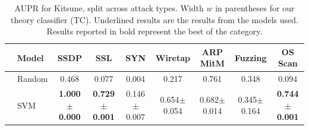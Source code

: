 \documentclass{article}
\begin{document}
\begin{table}[h]
    \centering
    \caption{AUPR for Kitsune, split across attack types. Width $w$ in parentheses for our theory classifier (TC). Underlined results are the results from the models used.
    Results reported in bold represent the best of the category.
    }
  \begin{adjustbox}{width=\textwidth}
    \begin{tabular}{cl|ccccccc}
    \toprule
        &Model & SSDP & SSL & SYN & Wiretap & ARP MitM & Fuzzing & OS Scan \\
         \midrule
        &Random & 0.468 & 0.077 & 0.004 & 0.217 & 0.761 & 0.348 & 0.094 \\
        \midrule
        \parbox[t]{2mm}{} & SVM & \textbf{1.000$\pm$0.000} & \textbf{0.729$\pm$0.001} & 0.146$\pm$0.007 & 0.654$\pm$0.054 & 0.682$\pm$0.014 & 0.345$\pm$0.164 & \textbf{0.744$\pm$0.001} \\

\end{tabular}
\end{adjustbox}
\end{table}
\end{document}
